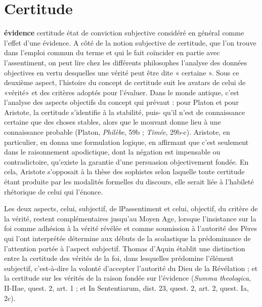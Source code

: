 
\section{Certitude}
%
{\bf évidence}
certitude état de conviction subjective
considéré en général comme l'effet d’une
évidence. A côté de la notion subjective de
certitude, que l’on trouve dans l’emploi
commun du terme et qui le fait coïncider
en partie avec l’assentiment, on peut lire
chez les différents philosophes l’analyse
des données objectives en vertu desquelles
une vérité peut être dite « certaine ». Sous
ce deuxième aspect, l’histoire du concept
de certitude suit les avatars de celui de
«vérité» et des critères adoptés pour
l’évaluer. Dans le monde antique, c’est
l'analyse des aspects objectifs du concept
qui prévaut : pour Platon et pour Aristote,
la certitude s’identifie à la stabilité, puis-
qu’il n’est de connaissance certaine que
des choses stables, alors que le mouvant
donne lieu à une connaissance probable
(Platon, {\it Philèbe}, 59b ; {\it Timée}, 29b-c).
Aristote, en particulier, en donna une
formulation logique, en affirmant que c’est
%
seulement dans le raisonnement apodictique,
dont la négation est impensable ou
contradictoire, qu’existe la garantie d’une
persuasion objectivement fondée. En cela,
Aristote s’opposait à la thèse des sophistes
selon laquelle toute certitude étant produite
par les modalités formelles du discours,
elle serait liée à l’habileté rhétorique
de celui qui l’énonce.

Les deux aspects, celui, subjectif, de
lPassentiment et celui, objectif, du critère
de la vérité, restent complémentaires jusqu’au
Moyen Age, lorsque l’insistance sur
la foi comme adhésion à la vérité révélée
et comme soumission à l'autorité des
Pères qui l’ont interprétée détermine aux
débuts de la scolastique la prédominance
de l'attention portée à l’aspect subjectif.
Thomas d'Aquin établit une distinction
entre la certitude des vérités de la foi,
dans lesquelles prédomine l’élément subjectif,
c’est-à-dire la volonté d’accepter
l’autorité du Dieu de la Révélation ; et la
certitude sur les vérités de la raison fondée
sur l’évidence ({\it Summa theologica}, 
II-IIae, quest. 2, art. 1 ; et {\it }In Sententiarum,
dist. 23, quest. 2, art. 2, quest. Ia, 2c).

